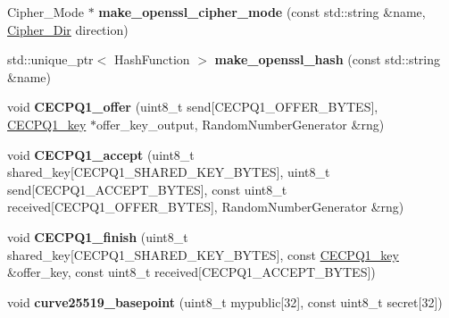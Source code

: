 \begin{DoxyCompactItemize}
\item 
\mbox{\label{namespace_botan_a65e1222669c530a37f4862179980fc5e}} 
Cipher\+\_\+\+Mode $\ast$ {\bfseries make\+\_\+openssl\+\_\+cipher\+\_\+mode} (const std\+::string \&name, \mbox{\hyperlink{namespace_botan_a8d9547a8fb3e868810b169b20ac389ee}{Cipher\+\_\+\+Dir}} direction)
\item 
\mbox{\label{namespace_botan_acfc79a98a16fa3d4ce049fd73df31b03}} 
std\+::unique\+\_\+ptr$<$ Hash\+Function $>$ {\bfseries make\+\_\+openssl\+\_\+hash} (const std\+::string \&name)
\item 
\mbox{\label{namespace_botan_a1e0f09284076ff0d5db9e2820f81e6ba}} 
void {\bfseries C\+E\+C\+P\+Q1\+\_\+offer} (uint8\+\_\+t send\mbox{[}C\+E\+C\+P\+Q1\+\_\+\+O\+F\+F\+E\+R\+\_\+\+B\+Y\+T\+ES\mbox{]}, \mbox{\hyperlink{class_botan_1_1_c_e_c_p_q1__key}{C\+E\+C\+P\+Q1\+\_\+key}} $\ast$offer\+\_\+key\+\_\+output, Random\+Number\+Generator \&rng)
\item 
\mbox{\label{namespace_botan_ac7ffabdf78ac511782ecb0b12641bf24}} 
void {\bfseries C\+E\+C\+P\+Q1\+\_\+accept} (uint8\+\_\+t shared\+\_\+key\mbox{[}C\+E\+C\+P\+Q1\+\_\+\+S\+H\+A\+R\+E\+D\+\_\+\+K\+E\+Y\+\_\+\+B\+Y\+T\+ES\mbox{]}, uint8\+\_\+t send\mbox{[}C\+E\+C\+P\+Q1\+\_\+\+A\+C\+C\+E\+P\+T\+\_\+\+B\+Y\+T\+ES\mbox{]}, const uint8\+\_\+t received\mbox{[}C\+E\+C\+P\+Q1\+\_\+\+O\+F\+F\+E\+R\+\_\+\+B\+Y\+T\+ES\mbox{]}, Random\+Number\+Generator \&rng)
\item 
\mbox{\label{namespace_botan_a4abb6e143b6dff32624c05dd6ef4a45a}} 
void {\bfseries C\+E\+C\+P\+Q1\+\_\+finish} (uint8\+\_\+t shared\+\_\+key\mbox{[}C\+E\+C\+P\+Q1\+\_\+\+S\+H\+A\+R\+E\+D\+\_\+\+K\+E\+Y\+\_\+\+B\+Y\+T\+ES\mbox{]}, const \mbox{\hyperlink{class_botan_1_1_c_e_c_p_q1__key}{C\+E\+C\+P\+Q1\+\_\+key}} \&offer\+\_\+key, const uint8\+\_\+t received\mbox{[}C\+E\+C\+P\+Q1\+\_\+\+A\+C\+C\+E\+P\+T\+\_\+\+B\+Y\+T\+ES\mbox{]})
\item 
\mbox{\label{namespace_botan_ae6ce071367a388e3ee45f4e6ae9df65c}} 
void {\bfseries curve25519\+\_\+basepoint} (uint8\+\_\+t mypublic\mbox{[}32\mbox{]}, const uint8\+\_\+t secret\mbox{[}32\mbox{]})
\item 
\mbox{\label{namespace_botan_a7babab84c98997eeecd402fb50d74b8b}} 

\end{DoxyCompactItemize}

